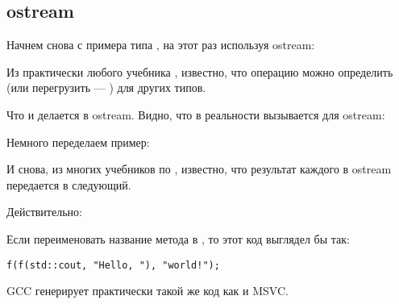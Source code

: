 \subsection{ostream}

Начнем снова с примера типа , на этот раз используя ostream:



Из практически любого учебника \Cpp, известно, что операцию \TT{<<} можно определить 
(или перегрузить --- ) для других типов.

Что и делается в ostream.
Видно, что в реальности вызывается  для ostream:



Немного переделаем пример:



И снова, из многих учебников по \Cpp, известно, что результат каждого  
в ostream передается в следующий.

Действительно:



Если переименовать название метода  в \ttf{}, то этот код выглядел бы так:

\begin{lstlisting}[style=customc]
f(f(std::cout, "Hello, "), "world!");
\end{lstlisting}

GCC генерирует практически такой же код как и MSVC.

